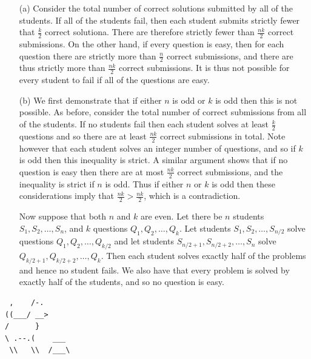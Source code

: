 \documentclass{article}
\begin{document}
\begin{enumerate}[1.]
\begin{enumerate}
\item[(a)] Consider the total number of correct solutions submitted by all of the students. If all of the students fail, then each student submits strictly fewer that $\frac{k}{2}$ correct solutiona. There are therefore strictly fewer than $\frac{nk}{2}$ correct submissions. On the other hand, if every question is easy, then for each question there are strictly more than $\frac{n}{2}$ correct submissions, and there are thus strictly more than $\frac{nk}{2}$ correct submissions. It is thus not possible for every student to fail if all of the questions are easy.

\item[(b)] We first demonstrate that if either $n$ is odd or $k$ is odd then this is not possible. As before, consider the total number of correct submissions from all of the students. If no students fail then each student solves at least $\frac{k}{2}$ questions and so there are at least $\frac{nk}{2}$ correct submissions in total. Note however that each student solves an integer number of questions, and so if $k$ is odd then this inequality is strict. A similar argument shows that if no question is easy then there are at most $\frac{nk}{2}$ correct submissions, and the inequality is strict if $n$ is odd. Thus if either $n$ or $k$ is odd then these considerations imply that $\frac{nk}{2} > \frac{nk}{2}$, which is a contradiction.

Now suppose that both $n$ and $k$ are even. Let there be $n$ students $S_1, S_2, \dots, S_n$, and $k$ questions $Q_1, Q_2, \dots, Q_k$. Let students $S_1, S_2, \dots, S_{n/2}$ solve questions $Q_1, Q_2, \dots, Q_{k/2}$ and let students $S_{n/2 + 1}, S_{n/2 + 2}, \dots, S_n$ solve $Q_{k/2 + 1}, Q_{k/2 + 2}, \dots, Q_k$. Then each student solves exactly half of the problems and hence no student fails. We also have that every problem is solved by exactly half of the students, and so no question is easy.

\end{enumerate}


\end{enumerate}


\vfill
\centering
\begin{BVerbatim}
 ,    /-.
((___/ __>
/      }
\ .--.(    ___
 \\   \\  /___\
\end{BVerbatim}
\end{document}
